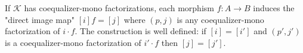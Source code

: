 If $\mathcal{K}$ has coequalizer-mono factorizations, each morphism $f: A \rightarrow B$ induces the "direct image map" $[i]f = [j]$ where $(p, j)$ is any coequalizer-mono factorization of $i \cdot f$. The construction is well defined: if $[i] = [i']$ and $(p', j')$ is a coequalizer-mono factorization of $i' \cdot f$ then $[j] = [j']$.
